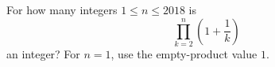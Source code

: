 For how many integers $1\le n\le2018$ is
\[
\prod_{k=2}^n\left(1+\dfrac{1}{k}\right)
\]
an integer? For $n=1$, use the empty-product value $1$.
